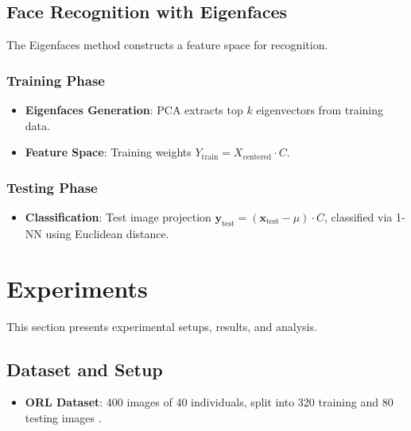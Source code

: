 \documentclass{article}
\begin{document}
	\subsection{Face Recognition with Eigenfaces}
	The Eigenfaces method constructs a feature space for recognition.
	
	\subsubsection{Training Phase}
	\begin{itemize}
		\item \textbf{Eigenfaces Generation}: PCA extracts top \(k\) eigenvectors from training data.
		\item \textbf{Feature Space}: Training weights \(Y_{\text{train}} = X_{\text{centered}} \cdot C\).
	\end{itemize}
	
	\subsubsection{Testing Phase}
	\begin{itemize}
		\item \textbf{Classification}: Test image projection \(\mathbf{y}_{\text{test}} = (\mathbf{x}_{\text{test}} - \mu) \cdot C\), classified via 1-NN using Euclidean distance.
	\end{itemize}
	
	\section{Experiments}
	This section presents experimental setups, results, and analysis.
	
	\subsection{Dataset and Setup}
	\begin{itemize}
		\item \textbf{ORL Dataset}: 400 images of 40 individuals, split into 320 training and 80 testing images \citep{samaria1994parameterisation}.
	\end{itemize}
	
\end{document}
